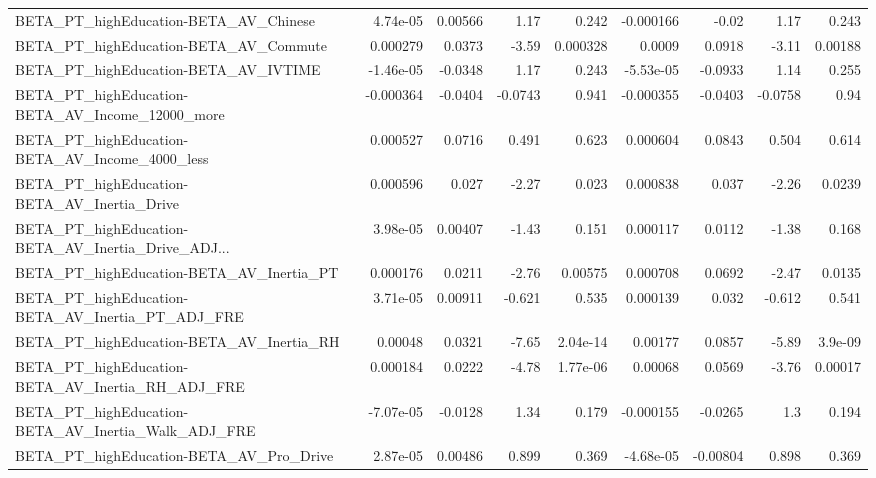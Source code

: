 \begin{tabular}{lrrrrrrrr}
BETA\_PT\_highEducation-BETA\_AV\_Chinese              &    4.74e-05 &      0.00566 &     1.17 &    0.242 &  -0.000166 &       -0.02 &         1.17 &         0.243 \\
BETA\_PT\_highEducation-BETA\_AV\_Commute              &    0.000279 &       0.0373 &    -3.59 & 0.000328 &     0.0009 &      0.0918 &        -3.11 &       0.00188 \\
BETA\_PT\_highEducation-BETA\_AV\_IVTIME               &   -1.46e-05 &      -0.0348 &     1.17 &    0.243 &  -5.53e-05 &     -0.0933 &         1.14 &         0.255 \\
BETA\_PT\_highEducation-BETA\_AV\_Income\_12000\_more    &   -0.000364 &      -0.0404 &  -0.0743 &    0.941 &  -0.000355 &     -0.0403 &      -0.0758 &          0.94 \\
BETA\_PT\_highEducation-BETA\_AV\_Income\_4000\_less     &    0.000527 &       0.0716 &    0.491 &    0.623 &   0.000604 &      0.0843 &        0.504 &         0.614 \\
BETA\_PT\_highEducation-BETA\_AV\_Inertia\_Drive        &    0.000596 &        0.027 &    -2.27 &    0.023 &   0.000838 &       0.037 &        -2.26 &        0.0239 \\
BETA\_PT\_highEducation-BETA\_AV\_Inertia\_Drive\_ADJ... &    3.98e-05 &      0.00407 &    -1.43 &    0.151 &   0.000117 &      0.0112 &        -1.38 &         0.168 \\
BETA\_PT\_highEducation-BETA\_AV\_Inertia\_PT           &    0.000176 &       0.0211 &    -2.76 &  0.00575 &   0.000708 &      0.0692 &        -2.47 &        0.0135 \\
BETA\_PT\_highEducation-BETA\_AV\_Inertia\_PT\_ADJ\_FRE   &    3.71e-05 &      0.00911 &   -0.621 &    0.535 &   0.000139 &       0.032 &       -0.612 &         0.541 \\
BETA\_PT\_highEducation-BETA\_AV\_Inertia\_RH           &     0.00048 &       0.0321 &    -7.65 & 2.04e-14 &    0.00177 &      0.0857 &        -5.89 &       3.9e-09 \\
BETA\_PT\_highEducation-BETA\_AV\_Inertia\_RH\_ADJ\_FRE   &    0.000184 &       0.0222 &    -4.78 & 1.77e-06 &    0.00068 &      0.0569 &        -3.76 &       0.00017 \\
BETA\_PT\_highEducation-BETA\_AV\_Inertia\_Walk\_ADJ\_FRE &   -7.07e-05 &      -0.0128 &     1.34 &    0.179 &  -0.000155 &     -0.0265 &          1.3 &         0.194 \\
BETA\_PT\_highEducation-BETA\_AV\_Pro\_Drive            &    2.87e-05 &      0.00486 &    0.899 &    0.369 &  -4.68e-05 &    -0.00804 &        0.898 &         0.369 \\

\end{tabular}
